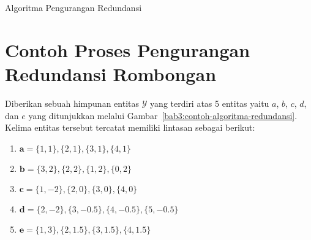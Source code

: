 \begin{algorithm}[h]
    \caption{Algoritma Pengurangan Redundansi}
    \DontPrintSemicolon
    
    \label{bab3:redundansi}
    
 
  
    
\end{algorithm}

\section{Contoh Proses Pengurangan Redundansi Rombongan}
\label{sec:redundancy-example}

Diberikan sebuah himpunan entitas $\mathcal{Y}$ yang terdiri atas 5 entitas yaitu $a$, $b$, $c$, $d$, dan $e$ yang ditunjukkan melalui Gambar~\ref{bab3:contoh-algoritma-redundansi}. Kelima entitas tersebut tercatat memiliki lintasan sebagai berikut:

\begin{enumerate}
    \item $\textbf{a} = \{ 1, 1 \}, \{ 2, 1 \}, \{ 3, 1 \}, \{ 4, 1\}$
    \item $\textbf{b} = \{ 3, 2 \}, \{ 2, 2 \}, \{ 1, 2 \}, \{ 0, 2\}$
    \item $\textbf{c} = \{ 1, -2 \}, \{ 2, 0 \}, \{ 3, 0 \}, \{ 4, 0 \}$
    \item $\textbf{d} = \{ 2, -2 \}, \{ 3, -0.5 \}, \{ 4, -0.5 \}, \{ 5, -0.5 \}$
    \item $\textbf{e} = \{ 1, 3 \}, \{ 2, 1.5 \}, \{ 3, 1.5 \}, \{ 4, 1.5 \}$
\end{enumerate}

